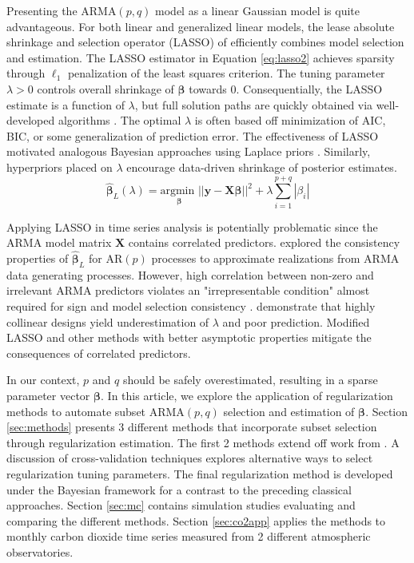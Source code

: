 Presenting the ARMA$(p,q)$ model as a linear Gaussian model is quite advantageous. For both linear and generalized linear models, the lease absolute shrinkage and selection operator (LASSO) of \cite{Tibshirani1996} efficiently combines model selection and estimation. The LASSO estimator in Equation \ref{eq:lasso2} achieves sparsity through $\ell_1$ penalization of the least squares criterion.  The tuning parameter $\lambda >0$ controls overall shrinkage of $\bm{\beta}$ towards 0. Consequentially, the LASSO estimate is a function of $\lambda$, but full solution paths are quickly obtained via well-developed algorithms \citep{Efron2004}. The optimal $\lambda$ is often based off minimization of AIC, BIC, or some generalization of prediction error. The effectiveness of LASSO motivated analogous Bayesian approaches using Laplace priors \citep{Park2008, Yuan2005}. Similarly, hyperpriors placed on $\lambda$ encourage data-driven shrinkage of posterior estimates.
\begin{equation}
\label{eq:lasso2}
\hat{\bm{\beta}}_{L} (\lambda)= \underset{\bm{\beta}}{\textrm{argmin }}  ||\bm{y}-\bm{X}\bm{\beta}||^2 + \lambda \sum\limits_{i=1}^{p+q}|\beta_i|
\end{equation}

Applying LASSO in time series analysis is potentially problematic since the ARMA model matrix $\bm{X}$ contains correlated predictors.  \cite{Nardi2011} explored the consistency properties of $\hat{\bm{\beta}}_{L}$ for AR$(p)$ processes to approximate realizations from ARMA data generating processes. However, high correlation between non-zero and irrelevant ARMA predictors violates an "irrepresentable condition" almost required for sign and model selection consistency \citep{Zhao2006}. \cite{Hebiri2013} demonstrate that highly collinear designs yield underestimation of $\lambda$ and poor prediction. Modified LASSO and other methods with better asymptotic properties mitigate the consequences of correlated predictors.

In our context, $p$ and $q$ should be safely overestimated, resulting in a sparse parameter vector $\bm{\beta}$. In this article, we explore the application of regularization methods to automate subset ARMA$(p,q)$ selection and estimation of $\bm{\beta}$. Section \ref{sec:methods} presents 3 different methods that incorporate subset selection through regularization estimation. The first 2 methods extend off work from \citep{Chen2011}. A discussion of cross-validation techniques explores alternative ways to select regularization tuning parameters. The final regularization method is developed under the Bayesian framework for a contrast to the preceding classical approaches. Section \ref{sec:mc} contains simulation studies evaluating and comparing the different methods. Section \ref{sec:co2app} applies the methods to monthly carbon dioxide time series measured from 2 different atmospheric observatories.










